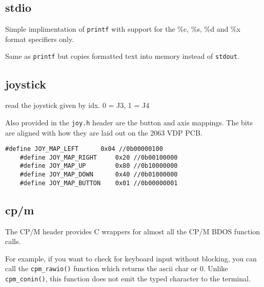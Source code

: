 \documentclass[10pt,a4paper,hidelinks]{article}
\begin{document}
\subsection{stdio}

\begin{description}[font=$\bullet$~\normalfont\scshape\color{red!50!black}]
  \item[printf] Simple implimentation of \texttt{printf} with support for the
    \%c, \%s, \%d and \%x format specifiers only.
  \item[sprintf] Same as \texttt{printf} but copies formatted text into memory
    instead of \texttt{stdout}.
\end{description}

\subsection{joystick}

\begin{description}[font=$\bullet$~\normalfont\scshape\color{red!50!black}]
  \item[joy(uint8\_t idx)] read the joystick given by idx.  0 = J3, 1 = J4
\end{description}

Also provided in the \texttt{joy.h} header are the button and axis mappings.
The bits are aligned with how they are laid out on the 2063 VDP PCB.

\begin{center}
  \begin{lstlisting}[caption=Joystick Button Mapping]
    #define JOY_MAP_LEFT      0x04 //0b00000100
    #define JOY_MAP_RIGHT     0x20 //0b00100000
    #define JOY_MAP_UP        0x80 //0b10000000
    #define JOY_MAP_DOWN      0x40 //0b01000000
    #define JOY_MAP_BUTTON    0x01 //0b00000001
  \end{lstlisting}
\end{center}
\label{lst:joystickmap}

\subsection{cp/m}
The CP/M header provides C wrappers for almost all the CP/M BDOS function calls.

For example, if you want to check for keyboard input without blocking, you can
call the \texttt{cpm\_rawio()} function which returns the ascii char or 0.
Unlike \texttt{cpm\_conin()}, this function does not emit the typed character to
the terminal.
\end{document}
